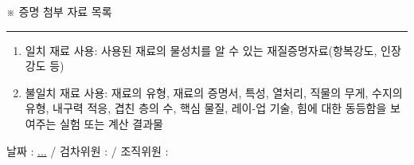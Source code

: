 \documentclass[final,a4paper,10pt]{report}
\begin{document}
\vspace{\baselineskip}

※ 증명 첨부 자료 목록

\vspace{\baselineskip}

\hrule

{\footnotesize
  \begin{enumerate}[label=\arabic*.]
    \item 일치 재료 사용: 사용된 재료의 물성치를 알 수 있는 재질증명자료(항복강도, 인장강도 등)
    \item 불일치 재료 사용: 재료의 유형, 재료의 증명서, 특성, 열처리, 직물의 무게, 수지의 유형, 내구력 적응, 겹친 층의 수, 핵심 물질, 레이-업 기술, 힘에 대한 동등함을 보여주는 실험 또는 계산 결과물
  \end{enumerate}
}

\vspace{\baselineskip}

\noindent\hfill 날짜 : \underline{\qquad\qquad.\qquad\qquad.\qquad\qquad.} / 검차위원 : \underline{\qquad\qquad\qquad\qquad} / 조직위원 : \underline{\qquad\qquad\qquad\qquad}
\end{document}
